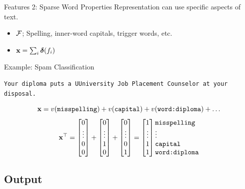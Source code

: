 \documentclass{beamer}
\begin{document}
\begin{frame}{Features 2: Sparse Word Properties}
  Representation can use specific aspects of text.
  \begin{itemize}
  \item $\mathcal{F}$; Spelling, inner-word capitals, trigger words, etc. 
  \item $\mathbf{x} = \sum_{i} \boldsymbol{\delta}(f_i)$ 
  \end{itemize}

  Example: Spam Classification

  \begin{center}
    \texttt{Your diploma puts a UUniversity Job Placement Counselor at
      your disposal.}
  \end{center}
  \[  \mathbf{x} = v(\texttt{misspelling}) + v(\texttt{capital}) + v(\texttt{word:diploma}) + \ldots\]
  \[
  \boldx^\top = 
 \begin{bmatrix} 0 \\ \vdots \\ 0\\  0 \\  \end{bmatrix} + 
 \begin{bmatrix} 0 \\ \vdots \\ 1\\ 0 \\  \end{bmatrix} +
 \begin{bmatrix} 0 \\ \vdots \\ 0\\  1 \\  \end{bmatrix} = 
 \begin{bmatrix} 1 \\ \vdots \\ 1 \\ 1 \\  \end{bmatrix}     \begin{matrix*}[l] \mathrm{\texttt{misspelling}} \\ \vdots \\ \mathrm{\texttt{capital}} \\ \mathrm{\texttt{word:diploma}} \\ \end{matrix*}
  \]
\end{frame}

\subsection{Output}
\end{document}
